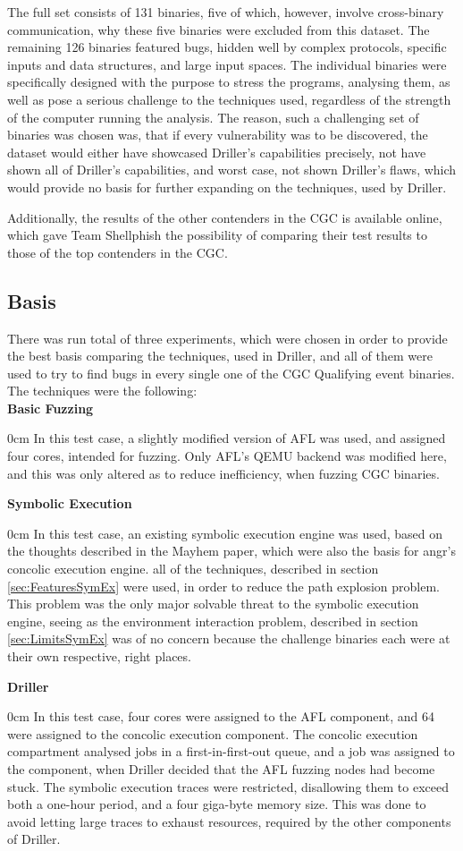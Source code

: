\documentclass[a4paper]{article}
\newcommand{\tbf}[1]{\textbf{#1}}
\newcommand{\marginwidth}{0.5cm}
\newcommand{\subsubsubsection}[1]{\tbf{#1}\begin{addmargin}[\marginwidth]{0cm}}
\begin{document}
The full set consists of 131 binaries, five of which, however, involve cross-binary communication, why these five binaries were excluded from this dataset. The remaining 126 binaries featured bugs, hidden well by complex protocols, specific inputs and data structures, and large input spaces. The individual binaries were specifically designed with the purpose to stress the programs, analysing them, as well as pose a serious challenge to the techniques used, regardless of the strength of the computer running the analysis. The reason, such a challenging set of binaries was chosen was, that if every vulnerability was to be discovered, the dataset would either have showcased Driller's capabilities precisely, not have shown all of Driller's capabilities, and worst case, not shown Driller's flaws, which would provide no basis for further expanding on the techniques, used by Driller. 

Additionally, the results of the other contenders in the CGC is available online, which gave Team Shellphish the possibility of comparing their test results to those of the top contenders in the CGC.
\subsection{Basis}
\label{sec:Basis}
There was run total of three experiments, which were chosen in order to provide the best basis comparing the techniques, used in Driller, and all of them were used to try to find bugs in every single one of the CGC Qualifying event binaries. The techniques were the following:\\
\subsubsubsection{Basic Fuzzing}
In this test case, a slightly modified version of AFL was used, and assigned four cores, intended for fuzzing. Only AFL's QEMU backend was modified  here, and this was only altered as to reduce inefficiency, when fuzzing CGC binaries. 
\end{addmargin}
\subsubsubsection{Symbolic Execution}
In this test case, an existing symbolic execution engine was used, based on the thoughts described in the Mayhem paper\cite{Mayhem}, which were also the basis for angr's concolic execution engine. all of the techniques, described in section \ref{sec:FeaturesSymEx} were used, in order to reduce the path explosion problem. This problem was the only major solvable threat to the symbolic execution engine, seeing as the environment interaction problem, described in section \ref{sec:LimitsSymEx} was of no concern because the challenge binaries each were at their own respective, right places.
\end{addmargin}
\subsubsubsection{Driller}
In this test case, four cores were assigned to the AFL component, and 64 were assigned to the concolic execution component. The concolic execution compartment analysed jobs in a first-in-first-out queue, and a job was assigned to the component, when Driller decided that the AFL fuzzing nodes had become stuck. The symbolic execution traces were restricted, disallowing them to exceed both a one-hour period, and a four giga-byte memory size. This was done to avoid letting large traces to exhaust resources, required by the other components of Driller.
\end{addmargin}
\end{document}
